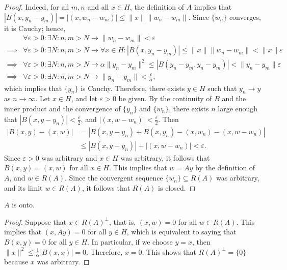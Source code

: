 \documentclass{homework}
\begin{document}
\begin{arabicparts}
\begin{proof}
			Indeed, for all $m,n$ and all $x\in H$, the definition of $A$ implies that $|B(x,y_n-y_m)| = |(x,w_n-w_m)| \le \lVert x\rVert \lVert w_n - w_m\rVert$. Since $\{w_n\}$ converges, it is Cauchy; hence,
			\begin{align}
				&\forall \varepsilon > 0: \exists N: n,m > N \rightarrow \lVert w_n - w_m\rVert < \varepsilon \\
				\implies & \forall \varepsilon > 0: \exists N: n,m > N \rightarrow \forall x \in H : |B(x,y_n-y_m)| \le \lVert x \rVert \lVert w_n - w_m\rVert < \lVert x\rVert\varepsilon \\
				\implies & \forall \varepsilon > 0: \exists N: n,m > N \rightarrow \alpha \lVert y_n - y_m\rVert^2 \le |B(y_n-y_m, y_n-y_m)| < \lVert y_n -y_m\rVert\varepsilon \\
				\implies & \forall \varepsilon > 0: \exists N: n,m > N \rightarrow \lVert y_n -y_m\rVert < \frac{\varepsilon}{\alpha},
			\end{align}
			which implies that $\{y_n\}$ is Cauchy. Therefore, there exists $y \in H$ such that $y_n \to y$ as $n \to \infty$. Let $x \in H$, and let $\varepsilon > 0$ be given. By the continuity of $B$ and the inner product and the convergence of $\{y_n\}$ and $\{w_n\}$, there exists $n$ large enough that $|B(x,y-y_n)| < \frac{\varepsilon}{2}$, and $|(x,w-w_n)| < \frac{\varepsilon}{2}$. Then
			\begin{equation}
			\begin{aligned}
				|B(x,y) - (x,w)| &= |B(x,y-y_n) + B(x,y_n) - (x,w_n) -(x,w-w_n)| \\
				&\le |B(x,y-y_n)| + |(x,w-w_n)| < \varepsilon.
			\end{aligned}
			\end{equation}
			Since $\varepsilon> 0$ was arbitrary and $x \in H$ was arbitrary, it follows that $B(x,y) = (x,w)$ for all $x \in H$. This implies that $w = Ay$ by the definition of $A$, and $w \in R(A)$. Since the convergent sequence $\{w_n\}\subseteq R(A)$ was arbitrary, and its limit $w \in R(A)$, it follows that $R(A)$ is closed.
		\end{proof}
		
		\questionpart
		$A$ is onto.
		\begin{proof}
			Suppose that $x \in R(A)^\perp$, that is, $(x, w) = 0$ for all $w \in R(A)$. This implies that $(x, Ay) = 0$ for all $y \in H$, which is equivalent to saying that $B(x, y) = 0$ for all $y \in H$. In particular, if we choose $y = x$, then $\lVert x\rVert^2 \le \frac{1}{\alpha}|B(x, x)| = 0$. Therefore, $x = 0$. This shows that $R(A)^\perp = \{0\}$ because $x$ was arbitrary. 
			

\end{proof}
\end{arabicparts}
\end{document}
